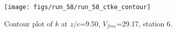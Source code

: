 \begin{figure}[H]
\centering
\texttt{[image: figs/run\_58/run\_58\_ctke\_contour]}
\caption{Contour plot of $k$ at $z/c$=9.50, $V_{free}$=29.17, station 6.}
\end{figure}


